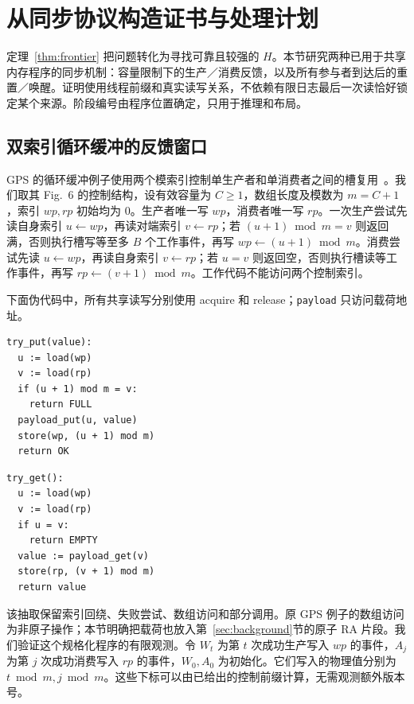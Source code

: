 \section{从同步协议构造证书与处理计划}\label{sec:protocols}
定理~\ref{thm:frontier} 把问题转化为寻找可靠且较强的 $H$。本节研究两种已用于共享内存程序的同步机制：容量限制下的生产／消费反馈，以及所有参与者到达后的重置／唤醒。证明使用线程前缀和真实读写关系，不依赖有限日志最后一次读恰好锁定某个来源。阶段编号由程序位置确定，只用于推理和布局。

\subsection{双索引循环缓冲的反馈窗口}\label{sec:buffer}
GPS 的循环缓冲例子使用两个模索引控制单生产者和单消费者之间的槽复用~\cite{gps2014}。我们取其 Fig.~6 的控制结构，设有效容量为 $C\ge1$，数组长度及模数为 $m=C+1$，索引 $wp,rp$ 初始均为 $0$。生产者唯一写 $wp$，消费者唯一写 $rp$。一次生产尝试先读自身索引 $u\gets wp$，再读对端索引 $v\gets rp$；若 $(u+1)\bmod m=v$ 则返回满，否则执行槽写等至多 $B$ 个工作事件，再写 $wp\gets(u+1)\bmod m$。消费尝试先读 $u\gets wp$，再读自身索引 $v\gets rp$；若 $u=v$ 则返回空，否则执行槽读等工作事件，再写 $rp\gets(v+1)\bmod m$。工作代码不能访问两个控制索引。

下面伪代码中，所有共享读写分别使用 acquire 和 release；\texttt{payload} 只访问载荷地址。
\begin{center}
\begin{minipage}[t]{.48\linewidth}\small
\begin{verbatim}
try_put(value):
  u := load(wp)
  v := load(rp)
  if (u + 1) mod m = v:
    return FULL
  payload_put(u, value)
  store(wp, (u + 1) mod m)
  return OK
\end{verbatim}
\end{minipage}\hfill
\begin{minipage}[t]{.48\linewidth}\small
\begin{verbatim}
try_get():
  u := load(wp)
  v := load(rp)
  if u = v:
    return EMPTY
  value := payload_get(v)
  store(rp, (v + 1) mod m)
  return value
\end{verbatim}
\end{minipage}
\end{center}
该抽取保留索引回绕、失败尝试、数组访问和部分调用。原 GPS 例子的数组访问为非原子操作；本节明确把载荷也放入第~\ref{sec:background}节的原子 RA 片段。我们验证这个规格化程序的有限观测。令 $W_t$ 为第 $t$ 次成功生产写入 $wp$ 的事件，$A_j$ 为第 $j$ 次成功消费写入 $rp$ 的事件，$W_0,A_0$ 为初始化。它们写入的物理值分别为 $t\bmod m,j\bmod m$。这些下标可以由已给出的控制前缀计算，无需观测额外版本号。

